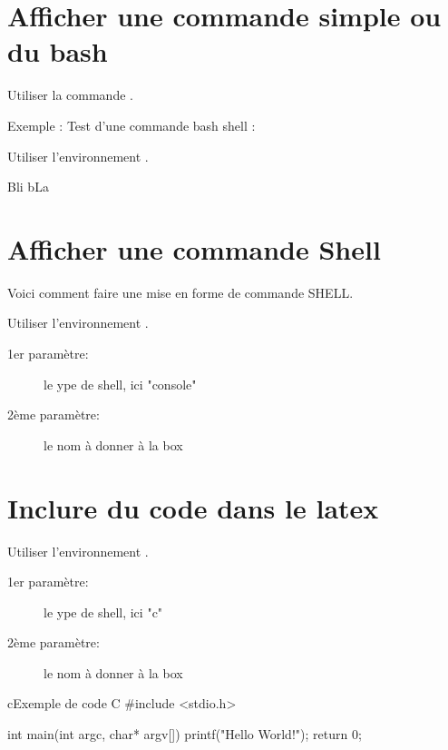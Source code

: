 \section{Afficher une commande simple ou du bash}

Utiliser la commande .

Exemple : Test d'une commande bash shell  :

Utiliser l'environnement .

Bli bLa


\section{Afficher une commande Shell}
\label{sec:shell}

Voici comment faire une mise en forme de commande SHELL.

Utiliser l'environnement .
\begin{description}
	\item[1er paramètre:] le ype de shell, ici "console"
	\item[2ème paramètre:] le nom à donner à la box
\end{description}



\section{Inclure du code dans le latex}

Utiliser l'environnement .
\begin{description}
	\item[1er paramètre:] le ype de shell, ici "c"
	\item[2ème paramètre:] le nom à donner à la box
\end{description}

\begin{sourcebox}{c}{Exemple de code C}
	#include <stdio.h>

	int main(int argc, char* argv[])
	{
			printf("Hello World!\n");
			return 0;
		}
\end{sourcebox}




